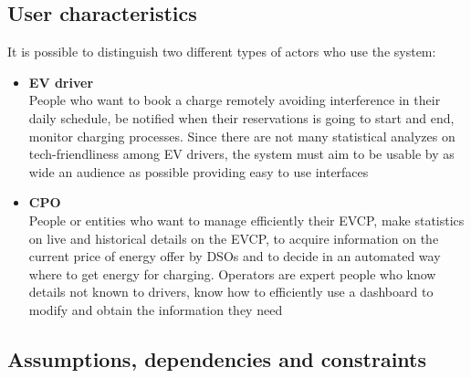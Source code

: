 \subsection{User characteristics}
It is possible to distinguish two different types of actors who use the system:
\begin{itemize}
      \item \textbf{EV driver}\\ People who want to book a charge remotely
            avoiding interference in their daily schedule, be notified when their reservations
            is going to start and end, monitor charging processes. Since there are not many statistical analyzes on tech-friendliness among EV drivers, the system must aim to be usable by as wide an audience as possible providing easy to use interfaces
      \item \textbf{CPO}\\ People or entities who want to manage efficiently their EVCP, make statistics on live and historical details on the EVCP,
            to acquire information on the current price of energy offer by DSOs and to decide in an automated way
            where to get energy for charging. Operators are expert people who know details not known to drivers, know how to efficiently use a dashboard to modify and obtain the information they need
\end{itemize}


\subsection{Assumptions, dependencies and constraints}
